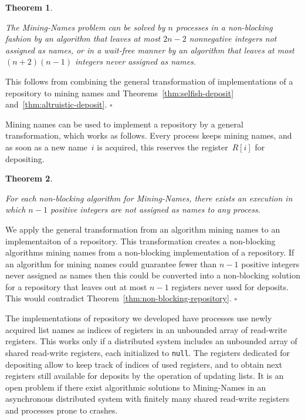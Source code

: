 \documentclass[11pt]{article}
\newcommand{\qed}{\hfill $\square$ \smallbreak}
\newenvironment{proof}{\noindent{\bf Proof:}}{\qed}
\newtheorem{theorem}{Theorem}
\begin{document}
\begin{theorem}
\label{thm:name-mining-solutions}

The Mining-Names problem can be solved by $n$ processes in a non-blocking fashion by an algorithm that leaves at most $2n-2$ nonnegative integers not assigned as names, or in a wait-free manner by an algorithm that leaves at most $(n+2)(n-1)$ integers never assigned as names.
\end{theorem}

\begin{proof}
This follows from combining the general transformation of implementations of a repository to mining names and Theorems~\ref{thm:selfish-deposit} and~\ref{thm:altruistic-deposit}.
\end{proof}

Mining names can be used to implement a repository  by a general transformation, which works as follows.
Every process keeps mining names, and as soon as a new name~$i$ is acquired, this reserves the register~$R[i]$ for depositing.



\begin{theorem}
\label{thm:name-mining-non-blocking-optimality}

For each non-blocking algorithm for Mining-Names, there exists an execution in which $n-1$ positive integers are not assigned as names to any process.
\end{theorem}

\begin{proof}
We apply the general transformation from an algorithm mining names to an implementaiton of a repository.
This transformation creates a non-blocking algorithms mining names from a non-blocking implementation of a repository.
If an algorithm for mining names could guarantee fewer than $n-1$ positive integers never assigned as names then this could be converted into a non-blocking solution for a repository that leaves out at most $n-1$ registers never used for deposits.
This would contradict Theorem~\ref{thm:non-blocking-repository}.
\end{proof}

The implementations of repository we developed have processes use newly acquired list names as indices of registers in an unbounded array of read-write registers.
This works only if a distributed system includes an unbounded array of shared read-write registers, each initialized to \texttt{null}.
The registers dedicated for depositing allow to keep track of indices of used registers, and to obtain next registers still available for deposits by the operation of updating lists.
It is an open problem if there exist algorithmic solutions to Mining-Names in an asynchronous  distributed system with finitely many shared read-write registers and processes prone to crashes.







\end{document}
